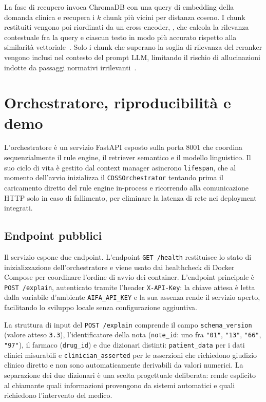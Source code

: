 La fase di recupero invoca ChromaDB con una query di embedding della domanda
clinica e recupera i $k$ chunk più vicini per distanza coseno. I chunk
restituiti vengono poi riordinati da un cross-encoder, \reranker, che calcola
la rilevanza contestuale fra la query e ciascun testo in modo più accurato
rispetto alla similarità vettoriale~\cite{nogueira2019passage}. Solo i chunk
che superano la soglia di rilevanza del reranker vengono inclusi nel contesto
del prompt LLM, limitando il rischio di allucinazioni indotte da passaggi
normativi irrilevanti~\cite{ji2023hallucination}.

\section{Orchestratore, riproducibilità e demo}
\label{sec:orchestrator-impl}

L'orchestratore è un servizio FastAPI esposto sulla porta 8001 che coordina
sequenzialmente il rule engine, il retriever semantico e il modello
linguistico. Il suo ciclo di vita è gestito dal context manager asincrono
\texttt{lifespan}, che al momento dell'avvio inizializza il
\texttt{CDSSOrchestrator} tentando prima il caricamento diretto del rule
engine in-process e ricorrendo alla comunicazione HTTP solo in caso di
fallimento, per eliminare la latenza di rete nei deployment integrati.

\subsection{Endpoint pubblici}

Il servizio espone due endpoint. L'endpoint \texttt{GET /health} restituisce
lo stato di inizializzazione dell'orchestratore e viene usato dai healthcheck
di Docker Compose per coordinare l'ordine di avvio dei container. L'endpoint
principale è \texttt{POST /explain}, autenticato tramite l'header
\texttt{X-API-Key}: la chiave attesa è letta dalla variabile d'ambiente
\texttt{AIFA\_API\_KEY} e la sua assenza rende il servizio aperto, facilitando
lo sviluppo locale senza configurazione aggiuntiva.

La struttura di input del \texttt{POST /explain} comprende il campo
\texttt{schema\_version} (valore atteso \texttt{3.3}), l'identificatore della
nota (\texttt{note\_id}: uno fra \texttt{"01"}, \texttt{"13"}, \texttt{"66"},
\texttt{"97"}), il farmaco (\texttt{drug\_id}) e due dizionari distinti:
\texttt{patient\_data} per i dati clinici misurabili e
\texttt{clinician\_asserted} per le asserzioni che richiedono giudizio clinico
diretto e non sono automaticamente derivabili da valori numerici. La
separazione dei due dizionari è una scelta progettuale deliberata: rende
esplicito al chiamante quali informazioni provengono da sistemi automatici e
quali richiedono l'intervento del medico.

